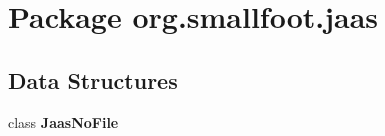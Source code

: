 \section{Package org.\-smallfoot.\-jaas}
\label{namespaceorg_1_1smallfoot_1_1jaas}
\subsection*{Data Structures}
\begin{DoxyCompactItemize}
\item 
class {\bf Jaas\-No\-File}
\end{DoxyCompactItemize}
